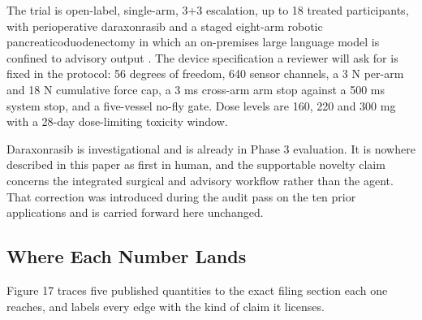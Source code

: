 The trial is open-label, single-arm, 3+3 escalation, up to 18 treated
participants, with perioperative daraxonrasib and a staged eight-arm robotic
pancreaticoduodenectomy in which an on-premises large language model is confined
to advisory output \cite{onpremwhippl,phase1ind}. The device specification a
reviewer will ask for is fixed in the protocol: 56 degrees of freedom, 640
sensor channels, a 3 N per-arm and 18 N cumulative force cap, a 3 ms cross-arm
arm stop against a 500 ms system stop, and a five-vessel no-fly gate. Dose
levels are 160, 220 and 300 mg with a 28-day dose-limiting toxicity window.

Daraxonrasib is investigational and is already in Phase 3 evaluation. It is
nowhere described in this paper as first in human, and the supportable novelty
claim concerns the integrated surgical and advisory workflow rather than the
agent. That correction was introduced during the audit pass on the ten prior
applications and is carried forward here unchanged.

\subsection{Where Each Number Lands}

Figure 17 traces five published quantities to the exact filing section each one
reaches, and labels every edge with the kind of claim it licenses.


